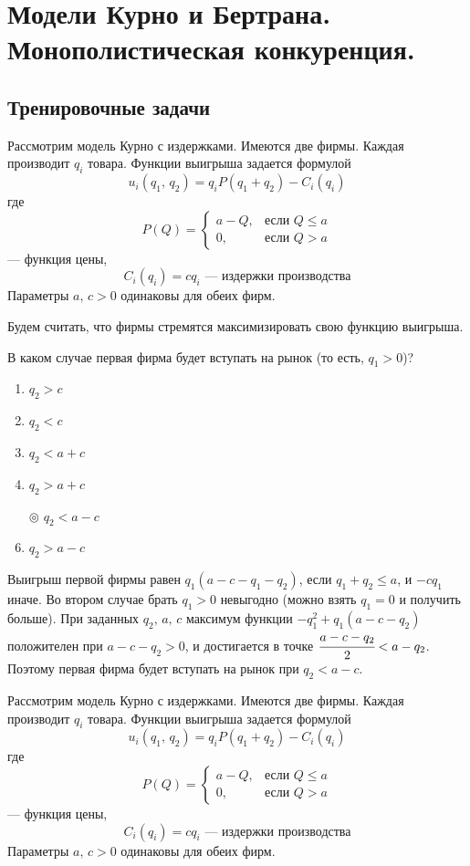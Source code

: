 	\section{Модели Курно и Бертрана. Монополистическая конкуренция.}
	
	\subsection{Тренировочные задачи}
	
	\task
	Рассмотрим модель Курно с издержками. Имеются две фирмы. Каждая производит $q_i$ товара. Функции выигрыша задается формулой
	\[
		u_i(q_1,\, q_2) = q_iP(q_1+q_2) - C_i(q_i)
	\]
	где
	\[
		P(Q) =
		\begin{cases}
			a - Q, & \text{если } Q \leq a \\
			0,	& \text{если } Q > a
		\end{cases}
	\] --- функция цены,
			$$
			C_i(q_i) = cq_i \text{ --- издержки производства}
			$$
	Параметры $a,\, c > 0$ одинаковы для обеих фирм.
	
	Будем считать, что фирмы стремятся максимизировать свою функцию выигрыша.
	
	В каком случае первая фирма будет вступать на рынок (то есть, $q_1 > 0$)?
	
	\begin{enumerate}[label=$\circ$]
		\item $q_2 > c$
		\item $q_2 < c$
		\item $q_2 < a + c$
		\item $q_2 > a + c$
		\item[$\circledcirc$] $q_2 < a - c$
		\item $q_2 > a - c$
	\end{enumerate}

	\solution
	Выигрыш первой фирмы равен $q_1(a-c-q_1-q_2)$, если $q_1+q_2 \leq a$, и $-cq_1$ иначе. Во втором случае брать $q_1 > 0$ невыгодно (можно взять $q_1=0$ и получить больше). При заданных $q_2,\, a,\, c$ максимум функции $-q_1^2 + q_1(a-c-q_2)$ положителен при $a-c-q_2 > 0$, и достигается в точке $\cfrac{a-c-q_2}{2} < a-q_2$. Поэтому первая фирма будет вступать на рынок при $q_2 < a-c$.
	
		\task
	Рассмотрим модель Курно с издержками. Имеются две фирмы. Каждая производит $q_i$ товара. Функции выигрыша задается формулой
	\[
	u_i(q_1,\, q_2) = q_iP(q_1+q_2) - C_i(q_i)
	\]
	где
	\[
	P(Q) =
	\begin{cases}
	a - Q, & \text{если } Q \leq a \\
	0,	& \text{если } Q > a
	\end{cases}
	\] --- функция цены,
	$$
	C_i(q_i) = cq_i \text{ --- издержки производства}
	$$
	Параметры $a,\, c > 0$ одинаковы для обеих фирм.
	
